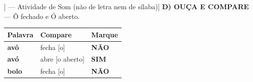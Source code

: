 \begin{exercicio}[Som /o/ [[o]] --- Atividade de Som (não de letra nem de sílaba)]
\textbf{D) OUÇA E COMPARE} --- Ô fechado e Ó aberto.

\begin{center}
\begin{tabular}{@{}p{4.2cm}p{6.2cm}p{1.6cm}@{}}
\hline
\textbf{Palavra} & \textbf{Compare} & \textbf{Marque} \\
\hline
\textbf{avô} & fecha [o] & \textbf{NÃO} \\
\textbf{avó} & abre [o aberto] & \textbf{SIM} \\
\textbf{bolo} & fecha [o] & \textbf{NÃO} \\
\hline
\end{tabular}
\end{center}

\end{exercicio}

